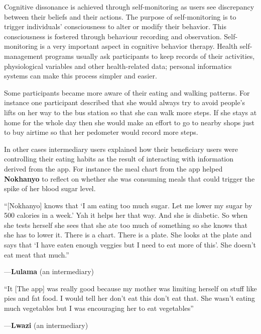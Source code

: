 \documentclass{sig-alternate}
\newenvironment{myquote}
               {\list{}{\rightmargin   \leftmargin
                        \parsep        0in }%
                \item\relax}
               {\endlist}
\newcommand{\userquote}[2]{\begin{samepage}\begin{myquote} 
     \em{\small{#2\begin{flushright}---#1\end{flushright}}}
   \end{myquote}\end{samepage}}
\begin{document}
Cognitive dissonance is achieved through self-monitoring as users see discrepancy between their beliefs and their actions. The purpose of self-monitoring is to trigger
individuals' consciousness to alter or modify their behavior. This consciousness is fostered
through behaviour recording and observation. Self-monitoring is a very important aspect in cognitive behavior therapy. Health self-management programs usually ask participants to keep records of their activities, physiological variables and other health-related data; personal informatics systems can make this process simpler and easier. \cite{medynskiy2010salud}

Some participants became more aware of their eating and walking patterns. For instance one participant described that she would always try to avoid people's lifts on her way to the bus station so that she can walk more steps. If she stays at home for the whole day then she would make an effort to go to nearby shops just to buy airtime so that her pedometer would record more steps.

In other cases intermediary users explained how their beneficiary users were
controlling their eating habits as the result of interacting with information
derived from the app. For instance the meal chart from the app helped
\textbf{Nokhanyo} to reflect on whether she was consuming meals that could
trigger the spike of her blood sugar level.

\userquote{\textbf{Lulama} (an intermediary)}{``[Nokhanyo] knows that `I am eating too 
much sugar. Let me lower my sugar by 500 calories in a week.' Yah it 
helps her that way. And she is diabetic. So when she tests herself she 
sees that she ate too much of something so she knows that she has to 
lower it. There is a chart. There is a plate. She looks at the plate and 
says that `I have eaten enough veggies but I need to eat more of this'. 
She doesn't eat meat that much.''}

\userquote{\textbf{Lwazi} (an intermediary)}
{``It [The app] was really good because my 
mother was limiting herself on stuff like pies and fat food. I would tell 
her don't eat this don't eat that. She wasn't eating much vegetables but I 
was encouraging her to eat vegetables''}

\end{document}
